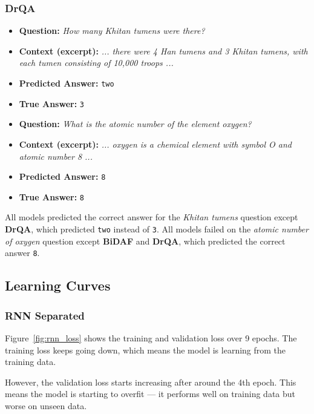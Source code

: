 \documentclass[runningheads]{llncs}
\begin{document}
\subsubsection{DrQA}

\begin{itemize}
    \item \textbf{Question:} \textit{How many Khitan tumens were there?}
    \item \textbf{Context (excerpt):} \textit{... there were 4 Han tumens and 3 Khitan tumens, with each tumen consisting of 10,000 troops ...}
    \item \textbf{Predicted Answer:} \texttt{two}
    \item \textbf{True Answer:} \texttt{3}
\end{itemize}

\begin{itemize}
    \item \textbf{Question:} \textit{What is the atomic number of the element oxygen?}
    \item \textbf{Context (excerpt):} \textit{... oxygen is a chemical element with symbol O and atomic number 8 ...}
    \item \textbf{Predicted Answer:} \texttt{8}
    \item \textbf{True Answer:} \texttt{8}
\end{itemize}

All models predicted the correct answer for the \textit{Khitan tumens} question except \textbf{DrQA}, which predicted \texttt{two} instead of \texttt{3}.  
All models failed on the \textit{atomic number of oxygen} question except \textbf{BiDAF} and \textbf{DrQA}, which predicted the correct answer \texttt{8}.

\subsection{Learning Curves}

\subsubsection*{RNN Separated}
Figure~\ref{fig:rnn_loss} shows the training and validation loss over 9 epochs. The training loss keeps going down, which means the model is learning from the training data.

However, the validation loss starts increasing after around the 4th epoch. This means the model is starting to overfit — it performs well on training data but worse on unseen data.
\end{document}
